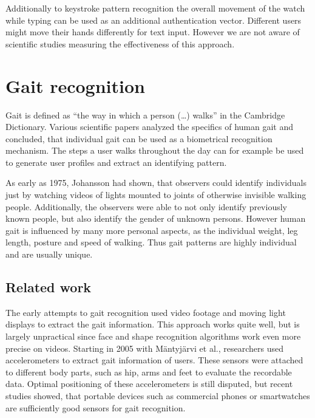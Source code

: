 Additionally to keystroke pattern recognition the overall movement of the watch while typing can be used as an additional authentication vector. Different users might move their hands differently for text input. However we are not aware of scientific studies measuring the effectiveness of this approach.

\section{Gait recognition}
Gait is defined as ``the way in which a person (\ldots) walks'' in the Cambridge Dictionary. Various scientific papers analyzed the specifics of human gait\cite{johansson1975visual, lee2002gait, johnstonsmartwatch} and concluded, that individual gait can be used as a biometrical recognition mechanism. The steps a user walks throughout the day can for example be used to generate user profiles and extract an identifying pattern. 

As early as 1975, Johansson\cite{johansson1975visual} had shown, that observers could identify individuals just by watching videos of lights mounted to joints of otherwise invisible walking people. Additionally, the observers were able to not only identify previously known people, but also identify the gender of unknown persons. However human gait is influenced by many more personal aspects, as the individual weight, leg length, posture and speed of walking. Thus gait patterns are highly individual and are usually unique.
\subsection{Related work}
The early attempts to gait recognition used video footage and moving light displays to extract the gait information. This approach works quite well, but is largely unpractical since face and shape recognition algorithms work even more precise on videos. Starting in 2005 with Mäntyjärvi et al.\cite{mantyjarvi2005identifying}, researchers used accelerometers to extract gait information of users. These sensors were attached to different body parts, such as hip, arms and feet to evaluate the recordable data. Optimal positioning of these accelerometers is still disputed, but recent studies showed, that portable devices such as commercial phones\cite{derawi2013gait} or smartwatches\cite{johnstonsmartwatch} are sufficiently good sensors for gait recognition.


